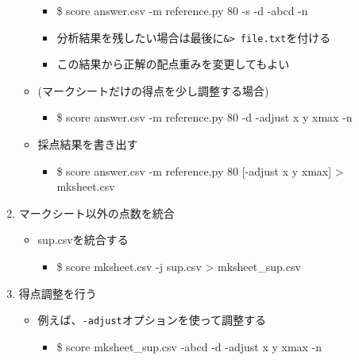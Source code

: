 \begin{enumerate}
\begin{itemize}
\begin{itemize}
\item \$ score answer.csv -m reference.py 80 -s -d -abcd -n

\item 分析結果を残したい場合は最後に\texttt{\&> file.txt}を付ける

\item この結果から正解の配点重みを変更してもよい

\end{itemize}

\item (マークシートだけの得点を少し調整する場合)

\begin{itemize}
\item \$ score answer.csv -m reference.py 80 -d -adjust x y xmax -n

\end{itemize}

\item 採点結果を書き出す

\begin{itemize}
\item \$ score answer.csv -m reference.py 80 {[-adjust x y xmax]} > mksheet.csv

\end{itemize}

\end{itemize}

\item マークシート以外の点数を統合

\begin{itemize}
\item sup.csvを統合する

\begin{itemize}
\item \$ score mksheet.csv -j sup.csv > mksheet\_sup.csv

\end{itemize}

\end{itemize}

\item 得点調整を行う

\begin{itemize}
\item 例えば、\texttt{-adjust}オプションを使って調整する

\begin{itemize}
\item \$ score mksheet\_sup.csv -abcd -d -adjust x y xmax -n


\end{itemize}
\end{itemize}
\end{enumerate}
